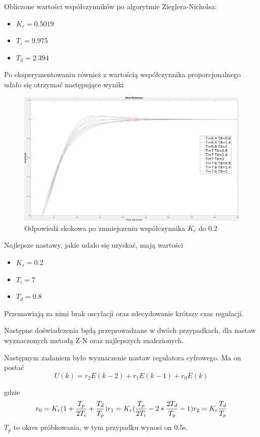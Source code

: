 \documentclass[fleqn]{article}
\begin{document}
Obliczone wartości współczynników po algorytmie Zieglera-Nicholsa:
\begin{itemize}
	\item $K_r = 0.5019$
	\item $T_i = 9.975$
	\item $T_d = 2.394$
\end{itemize}
\pagebreak
Po eksperymentowaniu również z wartością współczynnika proporcjonalnego udało się otrzymać następujące wyniki

\begin{figure}[H]
	\includegraphics[width=\textwidth]{scripts/odpowiedzskokM.png}
	\caption{Odpowiedź skokowa po zmniejszeniu współczynnika $K_r$ do 0.2}
\end{figure}

Najlepsze nastawy, jakie udało się uzyskać, mają wartości
\begin{itemize}
	\item $K_r = 0.2$
	\item $T_i = 7$
	\item $T_d = 0.8$
\end{itemize}

Przemawiają za nimi brak oscylacji oraz zdecydowanie krótszy czas regulacji.

Następne doświadczenia będą przeprowadzane w dwóch przypadkach, dla nastaw wyznaczonych metodą Z-N oraz najlepszych znalezionych.

Następnym zadaniem było wyznaczenie nastaw regulatora cyfrowego. Ma on postać
{\Large
\begin{equation}
	U(k)=r_2E(k-2)+r_1E(k-1)+r_0E(k)
\end{equation}
}

gdzie
{\Large
\begin{equation}
	r_0=K_r(1+\frac{T_p}{2T_i}+\frac{T_d}{T_p})\\
	r_1=K_r(\frac{T_p}{2T_i}-2*\frac{2T_d}{T_p}-1)\\
	r_2=K_r\frac{T_d}{T_p}
\end{equation}
}
$T_p$ to okres próbkowania, w tym przypadku wynosi on $0.5$s.
\pagebreak
\end{document}
